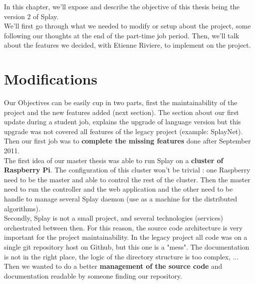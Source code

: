 \documentclass{eplmastersthesis}
\begin{document}
    In this chapter, we'll expose and describe the objective of this thesis
    being the version 2 of Splay.\\

    We'll first go through what we needed to modify or setup about the project,
    some following our thoughts at the end of the part-time job period.
    Then, we'll talk about the features we decided, with Etienne Riviere, to
    implement on the project.

    \section{Modifications} %

      Our Objectives can be easily cup in two parts, first the maintainability
      of the project and the new features added (next section). The section
      about our first update during a student job, explains the upgrade of
      language version but this upgrade was not covered all features of the
      legacy project (example: SplayNet). Then our first job was to
      \textbf{complete the missing features} done after  September 2011.\\

      The first idea of our master thesis was able to run Splay on a
      \textbf{cluster of Raspberry Pi}. The configuration of this cluster won't
      be trivial : one Raspberry need to be the master and able to control the
      rest of the cluster. Then the master need to run the controller and the
      web application and the other need to be handle to manage several Splay
      daemon (use as a machine for the distributed algorithms). \\

      Secondly, Splay is not a small project, and several technologies
      (services) orchestrated between then. For this reason, the source code
      architecture is very important for the project maintainability. In the
      legacy project all code was on a single git repository host on Github,
      but this one is a "mess". The documentation is not in the right place,
      the logic of the directory structure is too complex, ... Then we wanted
      to do a better \textbf{management of the source code} and documentation
      readable by someone finding our repository. \\
\end{document}
